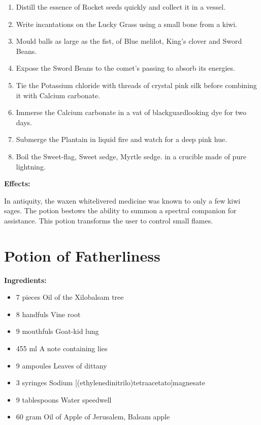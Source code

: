 \documentclass{article}
\begin{document}
\begin{enumerate}
  \item Distill the essence of Rocket seeds quickly and collect it in a vessel.
  \item Write incantations on the Lucky Grass using a small bone from a kiwi.
  \item Mould balls as large as the fist, of Blue melilot, King's clover and Sword Beans.
  \item Expose the Sword Beans to the comet’s passing to absorb its energies.
  \item Tie the Potassium chloride with threads of crystal pink silk before combining it with Calcium carbonate.
  \item Immerse the Calcium carbonate in a vat of blackguardlooking dye for two days.
  \item Submerge the Plantain in liquid fire and watch for a deep pink hue.
  \item Boil the Sweet-flag, Sweet sedge, Myrtle sedge. in a crucible made of pure lightning.
\end{enumerate}

\textbf{Effects:}

In antiquity, the waxen whitelivered medicine was known to only a few kiwi sages. The potion bestows the ability to summon a spectral companion for assistance. This potion transforms the user to control small flames.

\newpage
\section*{Potion of Fatherliness}

\textbf{Ingredients:}

\begin{itemize}
  \item 7 pieces Oil of the Xilobalsam tree
  \item 8 handfuls Vine root
  \item 9 mouthfuls Goat-kid lung
  \item 455 ml A note containing lies
  \item 9 ampoules Leaves of dittany
  \item 3 syringes Sodium [(ethylenedinitrilo)tetraacetato]magnesate
  \item 9 tablespoons Water speedwell
  \item 60 gram Oil of Apple of Jerusalem, Balsam apple
\end{itemize}
\end{document}
